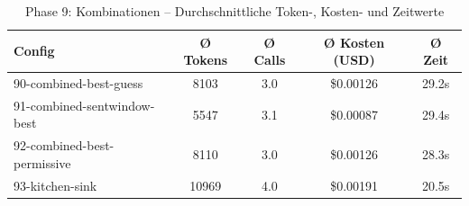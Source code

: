 \begin{table}[H]
\centering
\small
\begin{tabular}{lcccc}
\toprule
Config & Ø Tokens & Ø Calls & Ø Kosten (USD) & Ø Zeit \\
\midrule
90-combined-best-guess & 8103 & 3.0 & \$0.00126 & 29.2s \\
91-combined-sentwindow-best & 5547 & 3.1 & \$0.00087 & 29.4s \\
92-combined-best-permissive & 8110 & 3.0 & \$0.00126 & 28.3s \\
93-kitchen-sink & 10969 & 4.0 & \$0.00191 & 20.5s \\
\bottomrule
\end{tabular}
\caption{Phase 9: Kombinationen -- Durchschnittliche Token-, Kosten- und Zeitwerte}
\label{tab:phase9_cost}
\end{table}